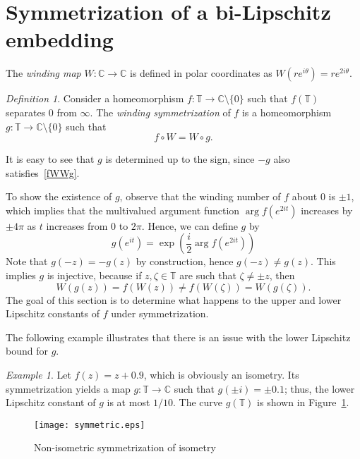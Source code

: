 \documentclass[11pt]{amsart}
\theoremstyle{remark}
\newtheorem{definition}[theorem]{Definition}
\newtheorem{example}[theorem]{Example}
\numberwithin{equation}{section}
\newcommand{\C}{\mathbb{C}}
\newcommand{\T}{\mathbb{T}}
\begin{document}
\section{Symmetrization of a bi-Lipschitz embedding}\label{symmsec}

The \textit{winding map} $W\colon\C\to\C$ is defined in polar coordinates as $W(re^{i\theta}) = re^{2i\theta}$. 

\begin{definition}
Consider a homeomorphism $f\colon \T\to\C\setminus \{0\}$ such that $f(\T)$ separates $0$ from $\infty$. The \textit{winding symmetrization} of $f$ is a homeomorphism $g\colon \T\to\C\setminus \{0\}$ such that
\begin{equation}\label{fWWg}
f\circ W = W\circ g.
\end{equation}
\end{definition}

It is easy to see that $g$ is determined up to the sign, since $-g$ also satisfies~\eqref{fWWg}. 

To show the existence of $g$, observe that the winding number of $f$ about $0$ is $\pm 1$, which implies that the multivalued argument function 
$\arg f(e^{2it})$ increases by $\pm 4\pi$ as $t$ increases from $0$ to $2\pi$. Hence, we can define $g$ by  
\begin{equation}\label{symmhomeo}
g(e^{it}) = \exp\left(\frac{i}{2} \arg f(e^{2it})\right )
\end{equation}
Note that $g(-z)=-g(z)$ by construction, hence $g(-z)\ne g(z)$. This implies $g$ is injective, because if $z,\zeta \in \T$ are such that $\zeta \ne \pm z$, then 
\[ W(g(z)) = f(W(z))\ne f(W(\zeta)) = W(g(\zeta)).\]
The goal of this section is to determine what happens to the upper and lower Lipschitz constants of $f$ under symmetrization. 

The following example illustrates that there is an issue with the lower Lipschitz bound for $g$. 

\begin{example}\label{badcircle} Let $f(z) = z + 0.9$, which is obviously an isometry. Its symmetrization yields a map $g\colon\T\to\C$ such that $g(\pm i) = \pm 0.1$; thus, the lower Lipschitz constant of $g$ is at most $1/10$. The curve $g(\T)$ is shown in Figure~\ref{Symmetrizationisometry}.
\end{example}
 
\begin{figure}[ht]
\centering 
\texttt{[image: symmetric.eps]}
\caption{Non-isometric symmetrization of isometry} \label{Symmetrizationisometry}
\end{figure} 
\end{document}
